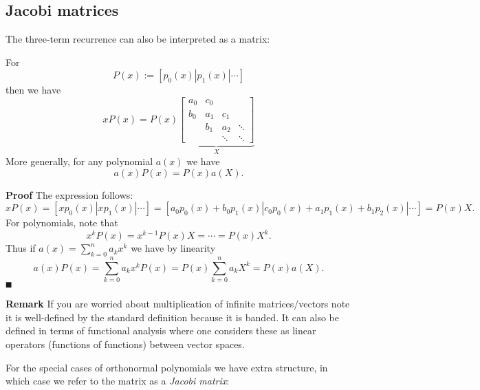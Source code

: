 \subsection{Jacobi matrices}
The three-term recurrence can also be interpreted as a matrix:

\begin{corollary} For
\[
P(x) := [p_0(x) | p_1(x) | \ensuremath{\cdots}]
\]
then we have
\[
x P(x) = P(x) \underbrace{\begin{bmatrix} a_0 & c_0 \\
                                                        b_0 & a_1 & c_1\\
                                                        & b_1 & a_2 & \ensuremath{\ddots} \\
                                                        && \ensuremath{\ddots} & \ensuremath{\ddots}
                                                        \end{bmatrix}}_X
\]
More generally, for any polynomial $a(x)$ we have
\[
a(x) P(x) = P(x) a(X).
\]
\end{corollary}
\textbf{Proof} The expression follows:
\[
x P(x) = [xp_0(x) | xp_1(x) | \ensuremath{\cdots}] =
[a_0p_0(x) + b_0 p_1(x) | c_0 p_0(x) + a_1 p_1(x) + b_1 p_2(x) | \ensuremath{\cdots}] = P(x) X.
\]
For polynomials, note that
\[
x^k P(x) = x^{k-1} P(x) X = \ensuremath{\cdots} = P(x) X^k.
\]
Thus if $a(x) = \ensuremath{\sum}_{k=0}^n a_k x^k$ we have by linearity
\[
a(x) P(x) = \ensuremath{\sum}_{k=0}^n a_k x^k P(x) = P(x) \ensuremath{\sum}_{k=0}^n a_k X^k = P(x) a(X).
\]
\ensuremath{\QED}

\textbf{Remark} If you are worried about multiplication of infinite matrices/vectors note it is well-defined by the standard definition because it is banded. It can also be defined in terms of functional analysis where one considers these as linear operators (functions of functions) between vector spaces.

For the special cases of orthonormal polynomials we have extra structure, in which case we refer to the matrix as a \emph{Jacobi matrix}:


